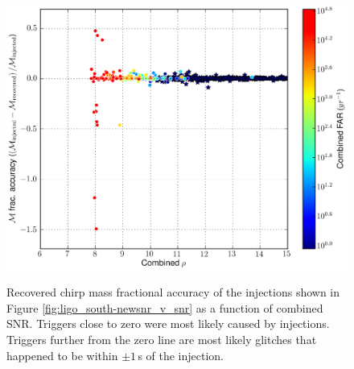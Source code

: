 \begin{figure}[p]
\center
\includegraphics[width=6in]{figures/ligo_south/H1L1-ligolw_cbc_plotfm_Non-Spinning_frac_accuracy_mathcalM_mathrminjected_0_3_F3_BNSLININJ+BNSLOGINJ+NSBHLININJ+NSBHLOGINJ+BBHLININJ+BBHLOGINJ_PLOTTED-961545543-3628944.png}
\label{fig:ligo_south-inj_mchirp_accuracy}
\caption{Recovered chirp mass fractional accuracy of the injections shown in Figure \ref{fig:ligo_south-newsnr_v_snr} as a function of combined \ac{SNR}. Triggers close to zero were most likely caused by injections. Triggers further from the zero line are most likely glitches that happened to be within $\pm 1\,$s of the injection.}
\end{figure}
